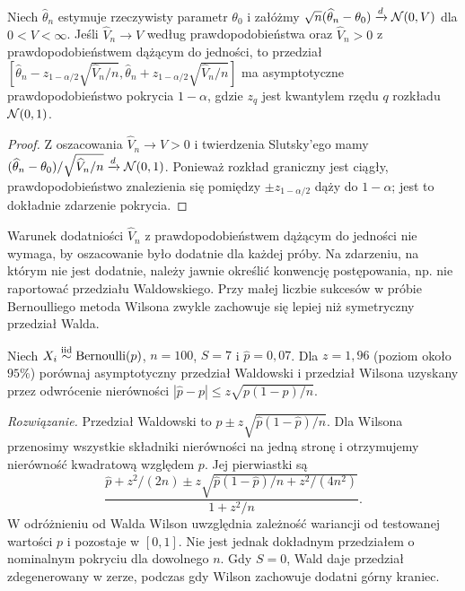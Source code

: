 \begin{stwierdzenie}
\label{prop:wald-ci}
Niech $\widehat\theta_n$ estymuje rzeczywisty parametr
$\theta_0$ i załóżmy
$\sqrt n(\widehat\theta_n-\theta_0)\xrightarrow{d}
\mathcal N(0,V)$ dla $0<V<\infty$.
Jeśli $\widehat V_n\to V$ według prawdopodobieństwa
oraz $\widehat V_n>0$ z prawdopodobieństwem dążącym do
jedności, to przedział
$[\widehat\theta_n-z_{1-\alpha/2}\sqrt{\widehat V_n/n},
\widehat\theta_n+z_{1-\alpha/2}\sqrt{\widehat V_n/n}]$
ma asymptotyczne prawdopodobieństwo pokrycia $1-\alpha$,
gdzie $z_q$ jest kwantylem rzędu $q$ rozkładu $\mathcal N(0,1)$.
\end{stwierdzenie}
\begin{proof}
Z oszacowania $\widehat V_n\to V>0$ i twierdzenia Slutsky'ego
mamy $(\widehat\theta_n-\theta_0)/\sqrt{\widehat V_n/n}
\xrightarrow{d}\mathcal N(0,1)$. Ponieważ rozkład graniczny
jest ciągły, prawdopodobieństwo znalezienia się pomiędzy
$\pm z_{1-\alpha/2}$ dąży do $1-\alpha$; jest to dokładnie
zdarzenie pokrycia.
\end{proof}

\begin{uwaga}
Warunek dodatniości $\widehat V_n$ z prawdopodobieństwem
dążącym do jedności nie wymaga, by oszacowanie było dodatnie
dla każdej próby. Na zdarzeniu, na którym nie jest dodatnie,
należy jawnie określić konwencję postępowania, np. nie
raportować przedziału Waldowskiego. Przy małej liczbie sukcesów
w próbie Bernoulliego metoda Wilsona zwykle zachowuje się
lepiej niż symetryczny przedział Walda.
\end{uwaga}

\begin{zadanie}
\label{zad:wilson-100}
Niech $X_i\mathrel{\overset{\mathrm{iid}}\sim}\operatorname{Bernoulli}(p)$, $n=100$,
$S=7$ i $\widehat p=0{,}07$. Dla $z=1{,}96$ (poziom około
$95\%$) porównaj asymptotyczny przedział Waldowski i
przedział Wilsona uzyskany przez odwrócenie nierówności
$|\widehat p-p|\le z\sqrt{p(1-p)/n}$.
\par\emph{Rozwiązanie.} Przedział Waldowski to
$\widehat p\pm z\sqrt{\widehat p(1-\widehat p)/n}$.
Dla Wilsona przenosimy wszystkie składniki nierówności na
jedną stronę i otrzymujemy nierówność kwadratową względem $p$.
Jej pierwiastki są
\[
\frac{\widehat p+z^2/(2n)\pm
z\sqrt{\widehat p(1-\widehat p)/n+z^2/(4n^2)}}{1+z^2/n}.
\]
W odróżnieniu od Walda Wilson uwzględnia zależność wariancji
od testowanej wartości $p$ i pozostaje w $[0,1]$.
Nie jest jednak dokładnym przedziałem o nominalnym pokryciu
dla dowolnego $n$. Gdy $S=0$, Wald daje przedział zdegenerowany
w zerze, podczas gdy Wilson zachowuje dodatni górny kraniec.
\end{zadanie}


